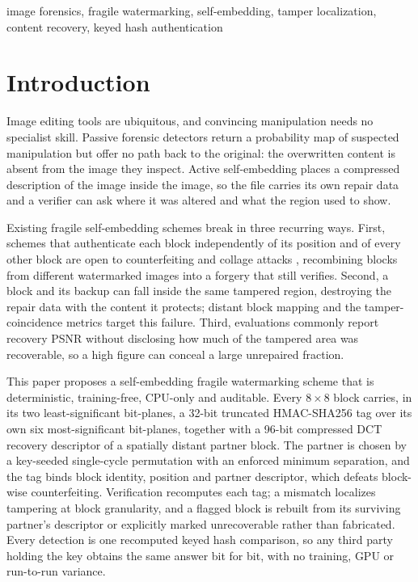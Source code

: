 \documentclass[conference]{IEEEtran}
\begin{document}
\begin{IEEEkeywords}
image forensics, fragile watermarking, self-embedding, tamper localization,
content recovery, keyed hash authentication
\end{IEEEkeywords}


\section{Introduction}

Image editing tools are ubiquitous, and convincing manipulation needs no specialist skill. Passive forensic detectors \cite{zhou2018learning,wu2019mantranet} return a probability map of suspected manipulation but offer no path back to the original: the overwritten content is absent from the image they inspect. Active self-embedding \cite{fridrich1999selfembedding,fridrich1999selfcorrecting} places a compressed description of the image inside the image, so the file carries its own repair data and a verifier can ask where it was altered and what the region used to show.

Existing fragile self-embedding schemes break in three recurring ways. First, schemes that authenticate each block independently of its position and of every other block are open to counterfeiting and collage attacks \cite{holliman2000counterfeiting,fridrich2002security}, recombining blocks from different watermarked images into a forgery that still verifies. Second, a block and its backup can fall inside the same tampered region, destroying the repair data with the content it protects; distant block mapping \cite{ausr3} and the tamper-coincidence metrics \cite{tcbr_tcbd} target this failure. Third, evaluations commonly report recovery PSNR without disclosing how much of the tampered area was recoverable, so a high figure can conceal a large unrepaired fraction.

This paper proposes a self-embedding fragile watermarking scheme that is deterministic, training-free, CPU-only and auditable. Every $8{\times}8$ block carries, in its two least-significant bit-planes, a 32-bit truncated HMAC-SHA256 tag over its own six most-significant bit-planes, together with a 96-bit compressed DCT recovery descriptor of a spatially distant partner block. The partner is chosen by a key-seeded single-cycle permutation with an enforced minimum separation, and the tag binds block identity, position and partner descriptor, which defeats block-wise counterfeiting. Verification recomputes each tag; a mismatch localizes tampering at block granularity, and a flagged block is rebuilt from its surviving partner's descriptor or explicitly marked unrecoverable rather than fabricated. Every detection is one recomputed keyed hash comparison, so any third party holding the key obtains the same answer bit for bit, with no training, GPU or run-to-run variance.
\end{document}

